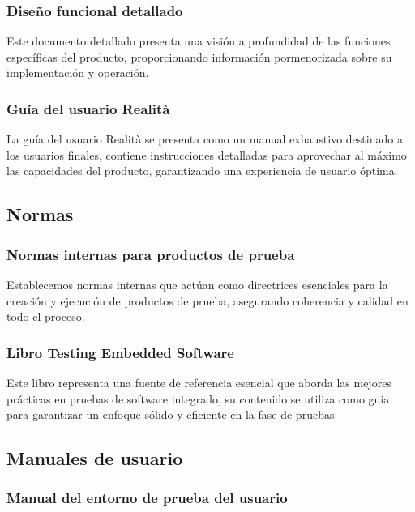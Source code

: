 \documentclass[12pt,a4paper, twoside]{article} %
\begin{document}
\subsubsection{Diseño funcional detallado}

Este documento detallado presenta una visión a profundidad de las funciones específicas del producto, proporcionando información pormenorizada sobre su implementación y operación.

\subsubsection{Guía del usuario Realità}

La guía del usuario Realità se presenta como un manual exhaustivo destinado a los usuarios finales, contiene instrucciones detalladas para aprovechar al máximo las capacidades del producto, garantizando una experiencia de usuario óptima.

\subsection{Normas}
\subsubsection{Normas internas para productos de prueba}

Establecemos normas internas que actúan como directrices esenciales para la creación y ejecución de productos de prueba, asegurando coherencia y calidad en todo el proceso.

\subsubsection{Libro Testing Embedded Software}

Este libro representa una fuente de referencia esencial que aborda las mejores prácticas en pruebas de software integrado, su contenido se utiliza como guía para garantizar un enfoque sólido y eficiente en la fase de pruebas.

\subsection{Manuales de usuario}
\subsubsection{Manual del entorno de prueba del usuario}
\end{document}

